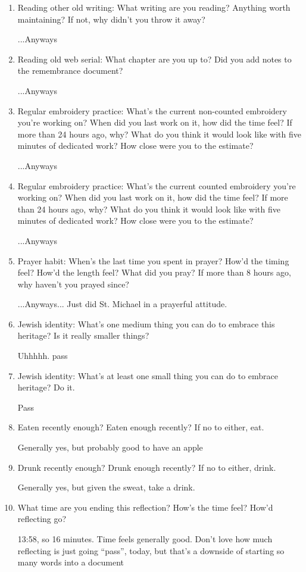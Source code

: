 \documentclass[12pt]{article}
\newcommand{\say}[1]{``#1''}
\renewcommand{\,}{\textsuperscript{,}}
\begin{document}
\begin{enumerate}
...Anyways

\item Reading other old writing: What writing are you reading? Anything worth maintaining? If not, why didn't you throw it away?

...Anyways

\item Reading old web serial: What chapter are you up to? Did you add notes to the remembrance document?

...Anyways

\item Regular embroidery practice: What's the current non-counted embroidery you're working on? When did you last work on it, how did the time feel? If more than 24 hours ago, why? What do you think it would look like with five minutes of dedicated work? How close were you to the estimate?

...Anyways

\item Regular embroidery practice: What's the current counted embroidery you're working on? When did you last work on it, how did the time feel? If more than 24 hours ago, why? What do you think it would look like with five minutes of dedicated work? How close were you to the estimate?

...Anyways

\item Prayer habit: When's the last time you spent in prayer? How'd the timing feel? How'd the length feel? What did you pray? If more than 8 hours ago, why haven't you prayed since?

...Anyways... Just did St. Michael in a prayerful attitude.

\item Jewish identity: What's one medium thing you can do to embrace this heritage? Is it really smaller things?

Uhhhhh. pass

\item Jewish identity: What's at least one small thing you can do to embrace heritage? Do it.

Pass

\item Eaten recently enough? Eaten enough recently? If no to either, eat.

Generally yes, but probably good to have an apple

\item Drunk recently enough? Drunk enough recently? If no to either, drink.

Generally yes, but given the sweat, take a drink.

\item What time are you ending this reflection? How's the time feel? How'd reflecting go?

13:58, so 16 minutes. Time feels generally good. Don't love how much reflecting is just going \say{pass}, today, but that's a downside of starting so many words into a document

\end{enumerate}
\end{document}
